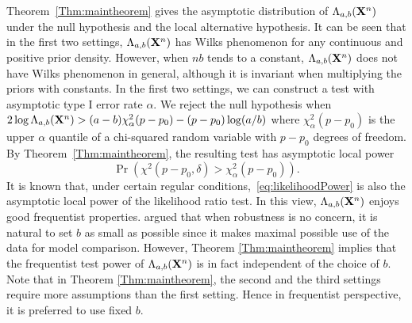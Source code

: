\documentclass[11pt]{article}
\theoremstyle{plain}
\theoremstyle{definition}
\theoremstyle{remark}
\begin{document}
Theorem~\ref{Thm:maintheorem} gives the asymptotic distribution of $\Lambda_{a,b} (\mathbf{X}^n)$ under the null hypothesis and the local alternative hypothesis.
It can be seen that in the first two settings, $\Lambda_{a,b}(\mathbf{X}^n)$ has Wilks phenomenon for any continuous and positive prior density.
However, when $nb$ tends to a constant, $\Lambda_{a,b}(\mathbf{X}^n)$ does not have Wilks phenomenon in general, although it is invariant when multiplying the priors with constants.
In the first two settings, we can construct a test with asymptotic type I error rate $\alpha$.
We reject the null hypothesis when $ 2\log \Lambda_{a,b} (\mathbf{X}^n)>(a-b)\chi^2_{\alpha}(p-p_0)-(p-p_0)\log (a/b) $ where $\chi^2_{\alpha}(p-p_0)$ is the upper $\alpha$ quantile of a chi-squared random variable with $p-p_0$ degrees of freedom.
By Theorem~\ref{Thm:maintheorem}, the resulting test has asymptotic local power
\begin{equation}\label{eq:likelihoodPower}
\Pr \left( \chi^2(p-p_0,\delta)> \chi^2_{\alpha}(p-p_0) \right).
\end{equation}
It is known that, under certain regular conditions,~\eqref{eq:likelihoodPower} is also the asymptotic local power of the likelihood ratio test. 
In this view, $\Lambda_{a,b} (\mathbf{X}^n)$ enjoys good frequentist properties.
\cite{Fractional1995} argued that when robustness is no concern, it is natural to set $b$ as small as possible since it makes maximal possible use of the data for model comparison.
However, Theorem \ref{Thm:maintheorem} implies that the frequentist test power of $\Lambda_{a,b}(\mathbf{X}^n)$ is in fact independent of the choice of $b$.
Note that in Theorem \ref{Thm:maintheorem}, the second and the third settings require more assumptions than the first setting.
Hence in frequentist perspective, it is preferred to use fixed $b$.
\end{document}
